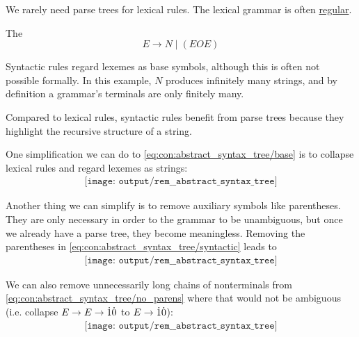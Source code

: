 \begin{concept}
\begin{thmenum}
    We rarely need parse trees for lexical rules. The lexical grammar is often \hyperref[def:chomsky_hierarchy/regular]{regular}.

     The 
    \begin{equation*}
      E \to N \mid (E O E)
    \end{equation*}

    Syntactic rules regard lexemes as base symbols, although this is often not possible formally. In this example, \( N \) produces infinitely many strings, and by definition a grammar's terminals are only finitely many.

    Compared to lexical rules, syntactic rules benefit from parse trees because they highlight the recursive structure of a string.
  \end{thmenum}

  One simplification we can do to \eqref{eq:con:abstract_syntax_tree/base} is to collapse lexical rules and regard lexemes as strings:
  \begin{equation}\label{eq:con:abstract_syntax_tree/syntactic}
    \begin{aligned}
      \texttt{[image: output/rem\_\_abstract\_syntax\_tree]}
    \end{aligned}
  \end{equation}

  Another thing we can simplify is to remove auxiliary symbols like parentheses. They are only necessary in order to the grammar to be unambiguous, but once we already have a parse tree, they become meaningless. Removing the parentheses in \eqref{eq:con:abstract_syntax_tree/syntactic} leads to
  \begin{equation}\label{eq:con:abstract_syntax_tree/no_parens}
    \begin{aligned}
      \texttt{[image: output/rem\_\_abstract\_syntax\_tree]}
    \end{aligned}
  \end{equation}

  We can also remove unnecessarily long chains of nonterminals from \eqref{eq:con:abstract_syntax_tree/no_parens} where that would not be ambiguous (i.e. collapse \( E \to E \to \dot{1} \dot{0} \) to \( E \to \dot{1} \dot{0} \)):
  \begin{equation}\label{eq:con:abstract_syntax_tree/collapsed}
    \begin{aligned}
      \texttt{[image: output/rem\_\_abstract\_syntax\_tree]}
    \end{aligned}
  \end{equation}


\end{concept}
